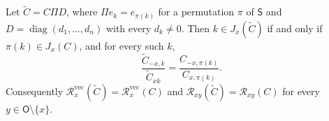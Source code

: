 Let \(\widetilde C=C\Pi D\), where \(\Pi e_k=e_{\pi(k)}\) for a permutation \(\pi\) of \(\mathsf S\) and \(D=\operatorname{diag}(d_1,\ldots,d_n)\) with every \(d_k\ne0\). Then \(k\in J_x(\widetilde C)\) if and only if \(\pi(k)\in J_x(C)\), and for every such \(k\),
\[
 \frac{\widetilde C_{-x,k}}{\widetilde C_{xk}}
 =\frac{C_{-x,\pi(k)}}{C_{x,\pi(k)}}.
\]
Consequently \(\mathcal R_x^{\mathrm{vec}}(\widetilde C)=\mathcal R_x^{\mathrm{vec}}(C)\) and \(\mathcal R_{xy}(\widetilde C)=\mathcal R_{xy}(C)\) for every \(y\in\mathsf O\setminus\{x\}\).